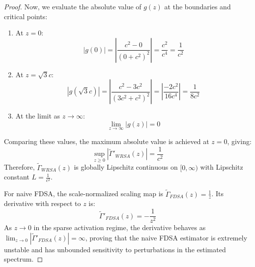 \documentclass{article}
\theoremstyle{plain}
\theoremstyle{definition}
\theoremstyle{remark}
\begin{document}
\begin{proof}
  Now, we evaluate the absolute value of $g(z)$ at the boundaries and critical points:
  \begin{enumerate}
    \item At $z = 0$: 
    \begin{equation}
      |g(0)| = \left| \frac{c^2 - 0}{(0 + c^2)^2} \right| = \frac{c^2}{c^4} = \frac{1}{c^2}
    \end{equation}
    \item At $z = \sqrt{3}c$:
    \begin{equation}
      |g(\sqrt{3}c)| = \left| \frac{c^2 - 3c^2}{(3c^2 + c^2)^2} \right| = \left| \frac{-2c^2}{16c^4} \right| = \frac{1}{8c^2}
    \end{equation}
    \item At the limit as $z \to \infty$:
    \begin{equation}
      \lim_{z \to \infty} |g(z)| = 0
    \end{equation}
  \end{enumerate}
  Comparing these values, the maximum absolute value is achieved at $z = 0$, giving:
  \begin{equation}
    \sup_{z \ge 0} \left| \tilde{\Gamma}'_{WRSA}(z) \right| = \frac{1}{c^2}
  \end{equation}
  Therefore, $\tilde{\Gamma}_{WRSA}(z)$ is globally Lipschitz continuous on $[0, \infty)$ with Lipschitz constant $L = \frac{1}{c^2}$.
  
  For naive FDSA, the scale-normalized scaling map is $\tilde{\Gamma}_{FDSA}(z) = \frac{1}{z}$. Its derivative with respect to $z$ is:
  \begin{equation}
    \tilde{\Gamma}'_{FDSA}(z) = -\frac{1}{z^2}
  \end{equation}
  As $z \to 0$ in the sparse activation regime, the derivative behaves as $\lim_{z \to 0} | \tilde{\Gamma}'_{FDSA}(z) | = \infty$, proving that the naive FDSA estimator is extremely unstable and has unbounded sensitivity to perturbations in the estimated spectrum.
\end{proof}
\end{document}
